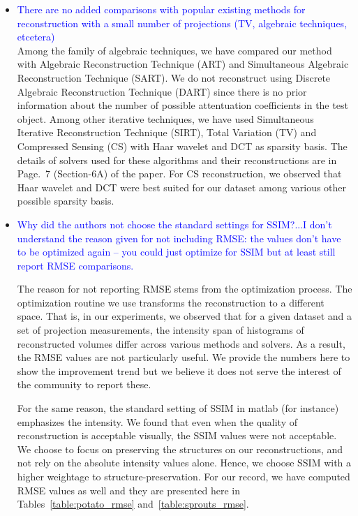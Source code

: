 \documentclass{article}
\begin{document}
\begin{itemize}
\item \textcolor{blue}{There are no added comparisons with popular existing methods for
  reconstruction with a small number of projections (TV, algebraic techniques, etcetera)}\\
  
 Among the family of algebraic techniques, we have compared our method
 with Algebraic Reconstruction Technique (ART) and Simultaneous
 Algebraic Reconstruction Technique (SART). We do not reconstruct
 using Discrete Algebraic Reconstruction Technique (DART) since there
 is no prior information about the number of possible attentuation
 coefficients in the test object. Among other iterative techniques, we
 have used Simultaneous Iterative Reconstruction Technique (SIRT),
 Total Variation (TV) and Compressed Sensing (CS) with Haar wavelet
 and DCT as sparsity basis. The details of solvers used for these
 algorithms and their reconstructions are in Page.~7 (Section-6A) of
 the paper. For CS reconstruction, we observed that Haar wavelet and
 DCT were best suited for our dataset among various other possible
 sparsity basis.

\item \textcolor{blue}{Why did the authors not choose the standard
  settings for SSIM?...I don’t understand the reason given for not
  including RMSE: the values don’t have to be optimized again -- you
  could just optimize for SSIM but at least still report RMSE
  comparisons.}

  The reason for not reporting RMSE stems from the optimization
  process. The optimization routine we use transforms the
  reconstruction to a different space.  That is, in our experiments,
  we observed that for a given dataset and a set of projection
  measurements, the intensity span of histograms of reconstructed
  volumes differ across various methods and solvers. As a result, the
  RMSE values are not particularly useful.  We provide the numbers
  here to show the improvement trend but we believe it does not serve
  the interest of the community to report these.

  For the same reason, the standard setting of SSIM in matlab (for
  instance) emphasizes the intensity. We found that even when the
  quality of reconstruction is acceptable visually, the SSIM values
  were not acceptable.  We choose
  to focus on preserving the structures on our reconstructions, and
  not rely on the absolute intensity values alone. Hence, we choose
  SSIM with a higher weightage to structure-preservation. For our
  record, we have computed RMSE values as well and they are presented
  here in Tables~\ref{table:potato_rmse} and~\ref{table:sprouts_rmse}.


\end{itemize}
\end{document}
